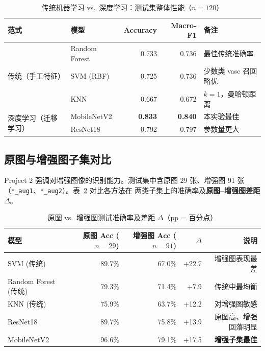 \documentclass[12pt,a4paper]{ctexart}
\begin{document}
\begin{table}[H]
  \centering
  \caption{传统机器学习 vs.\ 深度学习：测试集整体性能（$n=120$）}
  \label{tab:trad_vs_dl_overall}
  \begin{tabular}{llrrl}
    \toprule
    范式 & 模型 & Accuracy & Macro-F1 & 备注 \\
    \midrule
    \multirow{3}{*}{传统（手工特征）}
      & Random Forest & 0.733 & 0.736 & 最佳传统准确率 \\
      & SVM (RBF)     & 0.725 & 0.736 & 少数类 vasc 召回略优 \\
      & KNN           & 0.667 & 0.672 & $k{=}1$，曼哈顿距离 \\
    \midrule
    \multirow{2}{*}{深度学习（迁移学习）}
      & MobileNetV2   & \textbf{0.833} & \textbf{0.840} & 本实验最佳 \\
      & ResNet18      & 0.792 & 0.797 & 参数量更大 \\
    \bottomrule
  \end{tabular}
\end{table}

\subsection{原图与增强图子集对比}

Project 2 强调对增强图像的识别能力。测试集中含原图 29 张、增强图 91 张
（\texttt{*\_aug1}、\texttt{*\_aug2}）。表~\ref{tab:trad_vs_dl_aug} 对比各方法在
两类子集上的准确率及\textbf{原图--增强图差距} $\Delta$。

\begin{table}[H]
  \centering
  \caption{原图 vs.\ 增强图测试准确率及差距 $\Delta$（pp = 百分点）}
  \label{tab:trad_vs_dl_aug}
  \begin{tabular}{lrrrr}
    \toprule
    模型 & 原图 Acc ($n{=}29$) & 增强图 Acc ($n{=}91$) & $\Delta$ & 说明 \\
    \midrule
    SVM (传统)           & 89.7\% & 67.0\% & +22.7 & 增强图表现最差 \\
    Random Forest (传统) & 79.3\% & 71.4\% & +7.9  & 传统中最均衡 \\
    KNN (传统)           & 75.9\% & 63.7\% & +12.2 & 对增强图敏感 \\
  \midrule
    ResNet18             & 89.7\% & 75.8\% & +13.9 & 原图高、增强回落明显 \\
    MobileNetV2          & 96.6\% & 79.1\% & +17.5 & \textbf{增强子集最佳} \\
    \bottomrule
  \end{tabular}
\end{table}
\end{document}
